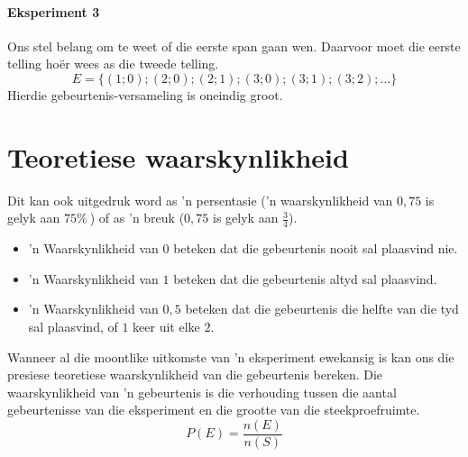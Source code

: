 \paragraph{Eksperiment 3} Ons stel belang om te weet of die eerste span gaan wen. Daarvoor moet die eerste telling ho\"er wees as die tweede telling.
\[E=\{(1;0);(2;0);(2;1);(3;0);(3;1);(3;2);\ldots\}\]
Hierdie gebeurtenis-versameling is oneindig groot.


\section{Teoretiese waarskynlikheid}
\par
Dit kan ook uitgedruk word as 'n persentasie ('n waarskynlikheid van $0,75$ is gelyk aan $75 \%~$) of as 'n breuk ($0,75$ is gelyk aan $\frac{3}{4}$).
\begin{itemize}
\item 'n Waarskynlikheid van $0$ beteken dat die gebeurtenis nooit sal plaasvind nie.
\item 'n Waarskynlikheid van $1$ beteken dat die gebeurtenis altyd sal plaasvind.
\item 'n Waarskynlikheid van $0,5$ beteken dat die gebeurtenis die helfte van die tyd sal plaasvind, of $1$ keer uit elke $2$.
\end{itemize}



Wanneer al die moontlike uitkomste van 'n eksperiment ewekansig is kan ons die presiese teoretiese waarskynlikheid van die gebeurtenis bereken. Die waarskynlikheid van 'n gebeurtenis is die verhouding tussen die aantal gebeurtenisse van die eksperiment en die grootte van die steekproefruimte.
\[P(E) = \frac{n(E)}{n(S)}\] \par

